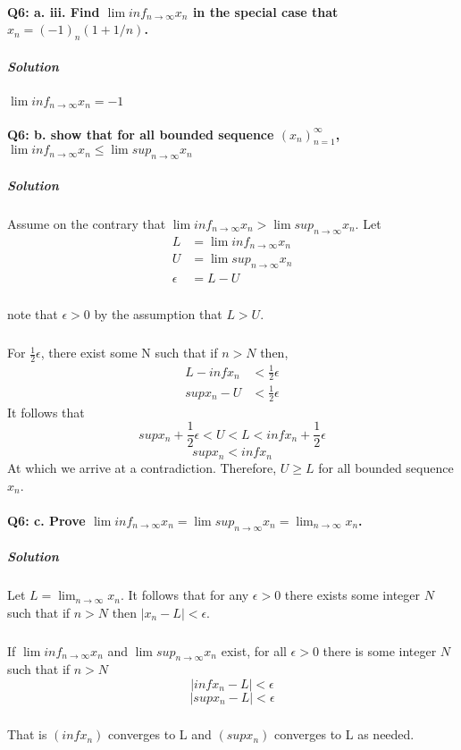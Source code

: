 \documentclass{article}
\begin{document}
\paragraph{Q6: a. iii. Find $\lim inf_{n\to\infty} x_n$ in the special case that $x_n = (-1)_n (1+1/n)$.}
\subparagraph{Solution} 
$\lim inf_{n\to\infty} x_n = -1$
\paragraph{Q6: b. show that for all bounded sequence $(x_n)^\infty_{n=1}$, $\lim inf _{n\to\infty} x_n \leq \lim sup _{n\to\infty} x_n$}
\subparagraph{Solution}
Assume on the contrary that $\lim inf _{n\to\infty} x_n > \lim sup _{n\to\infty} x_n$. Let
\begin{align*}
L &= \lim inf _{n\to\infty} x_n \\
U &= \lim sup_{n\to\infty} x_n\\
\epsilon &= L - U
\end{align*}
\subparagraph{}note that $\epsilon > 0$ by the assumption that $L > U$. \\
\subparagraph{}For $\frac{1}{2} \epsilon$, there exist some N such that if $ n > N$ then, 
\begin {align*}
L - inf x_n &< \frac{1}{2} \epsilon\\
sup x_n - U &< \frac{1}{2} \epsilon
\end{align*}
It follows that 
\begin{equation*}
sup x_n +\frac{1}{2} \epsilon < U < L < inf x_n + \frac{1}{2} \epsilon 
\end{equation*}
\begin{equation*}
sup x_n < inf x_n
\end{equation*}
At which we arrive at a contradiction. Therefore, $U\geq L$ for all bounded sequence $x_n$.
\paragraph {Q6: c. Prove $\lim inf_{n\to\infty} x_n = \lim sup_{n\to\infty} x_n = \lim_{n\to\infty} x_n$.}
\subparagraph{Solution}
Let $L = \lim _{n\to\infty} x_n$. It follows that for any $\epsilon > 0$ there exists some integer $N$ such that if $n>N$ then $|x_n - L| < \epsilon$.
\subparagraph{}
If $\lim inf _{n\to \infty} x_n$ and $\lim sup_{n\to\infty} x_n$ exist, for all $\epsilon > 0$ there is some integer $N$ such that if $n>N$
\begin{equation*}
|inf x_n - L | < \epsilon
\end{equation*}
\begin{equation*}
|sup x_n - L | < \epsilon
\end{equation*}
\subparagraph{}
That is $(inf x_n) $ converges to L and $(sup x_n) $ converges to L as needed.
\end{document}
